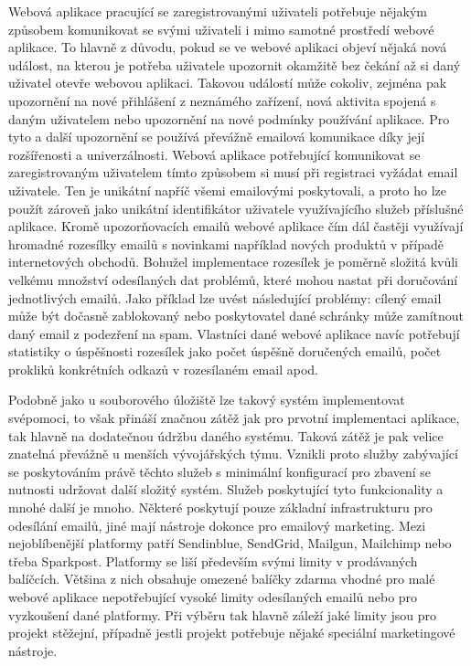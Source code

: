 \begin{itemize}
\begin{itemize}
	Webová aplikace pracující se zaregistrovanými uživateli potřebuje nějakým způsobem komunikovat se svými uživateli i
	mimo samotné prostředí webové aplikace.
	To hlavně z důvodu, pokud se ve webové aplikaci objeví nějaká nová událost, na kterou je potřeba uživatele upozornit
	okamžitě bez čekání až si daný uživatel otevře webovou aplikaci.
	Takovou událostí může cokoliv, zejména pak upozornění na nové přihlášení z neznámého zařízení, nová aktivita spojená
	s daným uživatelem nebo upozornění na nové podmínky používání aplikace.
	Pro tyto a další upozornění se používá převážně emailová komunikace díky její rozšířenosti a univerzálnosti.
	Webová aplikace potřebující komunikovat se zaregistrovaným uživatelem tímto způsobem si musí při registraci
	vyžádat email uživatele.
	Ten je unikátní napříč všemi emailovými poskytovali, a proto ho lze použít zároveň jako unikátní identifikátor
	uživatele využívajícího služeb příslušné aplikace.
	Kromě upozorňovacích emailů webové aplikace čím dál častěji využívají hromadné rozesílky emailů s novinkami
	například nových produktů v případě internetových obchodů.
	Bohužel implementace rozesílek je poměrně složitá kvůli velkému množství odesílaných dat problémů, které mohou nastat
	při doručování jednotlivých emailů.
	Jako příklad lze uvést následující problémy: cílený email může být dočasně zablokovaný nebo
	poskytovatel dané schránky může zamítnout daný email z podezření na spam.
	Vlastníci dané webové aplikace navíc potřebují statistiky o úspěšnosti rozesílek jako počet úspěšně doručených emailů,
	počet prokliků konkrétních odkazů v rozesílaném email apod.

	Podobně jako u souborového úložiště lze takový systém implementovat svépomoci, to však přináší značnou zátěž jak pro
	prvotní implementaci aplikace, tak hlavně na dodatečnou údržbu daného systému.
	Taková zátěž je pak velice znatelná převážně u menších vývojářských týmu.
	Vznikli proto služby zabývající se poskytováním právě těchto služeb s minimální konfigurací pro zbavení se nutnosti
	udržovat další složitý systém.
	Služeb poskytující tyto funkcionality a mnohé další je mnoho.
	Některé poskytují pouze základní infrastrukturu pro odesílání emailů, jiné mají nástroje dokonce pro emailový
	marketing.
	Mezi nejoblíbenější platformy patří Sendinblue, SendGrid, Mailgun, Mailchimp nebo třeba Sparkpost.
	Platformy se liší především svými limity v prodávaných balíčcích.
	Většina z nich obsahuje omezené balíčky zdarma vhodné pro malé webové aplikace nepotřebující vysoké limity odesílaných
	emailů nebo pro vyzkoušení dané platformy.
	Při výběru tak hlavně záleží jaké limity jsou pro projekt stěžejní, případně jestli projekt potřebuje nějaké speciální
	marketingové nástroje.


\end{itemize}
\end{itemize}
